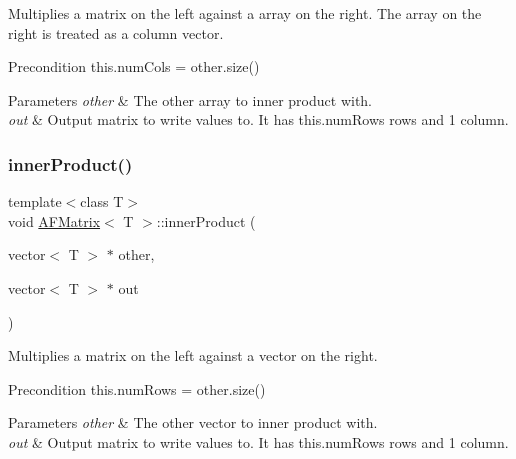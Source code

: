 Multiplies a matrix on the left against a array on the right. The array on the right is treated as a column vector. \begin{DoxyPrecond}{Precondition}
this.\+num\+Cols = other.\+size() 
\end{DoxyPrecond}

\begin{DoxyParams}{Parameters}
{\em other} & The other array to inner product with. \\
\hline
{\em out} & Output matrix to write values to. It has this.\+num\+Rows rows and 1 column. \\
\hline
\end{DoxyParams}
\mbox{\label{classAFMatrix_a4fa983f9e6a6c59e15bfc019d5c380b9}} 
\subsubsection{\texorpdfstring{inner\+Product()}{innerProduct()}\hspace{0.1cm}{\footnotesize\ttfamily [4/4]}}
{\footnotesize\ttfamily template$<$class T$>$ \\
void \hyperlink{classAFMatrix}{A\+F\+Matrix}$<$ T $>$\+::inner\+Product (\begin{DoxyParamCaption}\item[{vector$<$ T $>$ $\ast$}]{other,  }\item[{vector$<$ T $>$ $\ast$}]{out }\end{DoxyParamCaption})\hspace{0.3cm}{\ttfamily [inline]}}

Multiplies a matrix on the left against a vector on the right. \begin{DoxyPrecond}{Precondition}
this.\+num\+Rows = other.\+size() 
\end{DoxyPrecond}

\begin{DoxyParams}{Parameters}
{\em other} & The other vector to inner product with. \\
\hline
{\em out} & Output matrix to write values to. It has this.\+num\+Rows rows and 1 column. \\
\hline
\end{DoxyParams}
\mbox{\label{classAFMatrix_a7dd8d7a0e20f2c4d8580e1fe827809c8}} 

